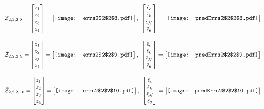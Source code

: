 \documentclass[12pt]{article}
\begin{document}
\begin{gather*}
\bar{\mathcal{Z}}_{2,2,2,8}=\begin{bmatrix}
z_1\\
z_2\\
z_3\\
z_4
 \end{bmatrix}= \begin{bmatrix}
\vcenter{\hbox{\texttt{[image: errs2\$2\$2\$8.pdf]}}}
 \end{bmatrix},\,\, \begin{bmatrix}
\hat{\epsilon}_c\\\hat{\epsilon}_k\\\hat{\epsilon}_\mathcal{N}\\\hat{\epsilon}_\theta
 \end{bmatrix}=\begin{bmatrix}
\vcenter{\hbox{\texttt{[image: predErrs2\$2\$2\$8.pdf]}}}
 \end{bmatrix}
\end{gather*}



\begin{gather*}
\bar{\mathcal{Z}}_{2,2,2,9}=\begin{bmatrix}
z_1\\
z_2\\
z_3\\
z_4
 \end{bmatrix}= \begin{bmatrix}
\vcenter{\hbox{\texttt{[image: errs2\$2\$2\$9.pdf]}}}
 \end{bmatrix},\,\, \begin{bmatrix}
\hat{\epsilon}_c\\\hat{\epsilon}_k\\\hat{\epsilon}_\mathcal{N}\\\hat{\epsilon}_\theta
 \end{bmatrix}=\begin{bmatrix}
\vcenter{\hbox{\texttt{[image: predErrs2\$2\$2\$9.pdf]}}}
 \end{bmatrix}
\end{gather*}

\begin{gather*}
\bar{\mathcal{Z}}_{2,2,2,10}=\begin{bmatrix}
z_1\\
z_2\\
z_3\\
z_4
 \end{bmatrix}= \begin{bmatrix}
\vcenter{\hbox{\texttt{[image: errs2\$2\$2\$10.pdf]}}}
 \end{bmatrix},\,\, \begin{bmatrix}
\hat{\epsilon}_c\\\hat{\epsilon}_k\\\hat{\epsilon}_\mathcal{N}\\\hat{\epsilon}_\theta
 \end{bmatrix}=\begin{bmatrix}
\vcenter{\hbox{\texttt{[image: predErrs2\$2\$2\$10.pdf]}}}
 \end{bmatrix}
\end{gather*}
\end{document}
